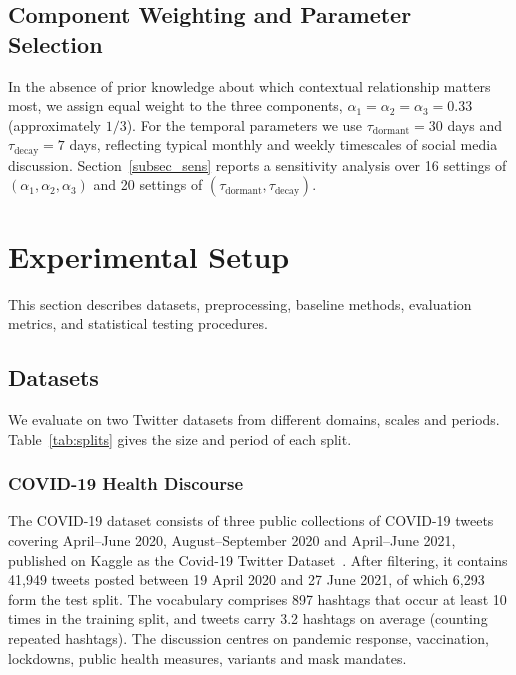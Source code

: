 \documentclass[pdflatex,sn-mathphys-num]{sn-jnl}%
\begin{document}
\subsection{Component Weighting and Parameter Selection}\label{subsec12}

In the absence of prior knowledge about which contextual relationship matters most, we assign equal weight to the three components, $\alpha_1 = \alpha_2 = \alpha_3 = 0.33$ (approximately $1/3$). For the temporal parameters we use $\tau_{\text{dormant}} = 30$ days and $\tau_{\text{decay}} = 7$ days, reflecting typical monthly and weekly timescales of social media discussion. Section~\ref{subsec_sens} reports a sensitivity analysis over 16 settings of $(\alpha_1, \alpha_2, \alpha_3)$ and 20 settings of $(\tau_{\text{dormant}}, \tau_{\text{decay}})$.


\section{Experimental Setup}\label{sec4}

This section describes datasets, preprocessing, baseline methods, evaluation metrics, and statistical testing procedures.

\subsection{Datasets}\label{subsec13}

We evaluate on two Twitter datasets from different domains, scales and periods. Table~\ref{tab:splits} gives the size and period of each split.

\subsubsection{COVID-19 Health Discourse}\label{subsubsec4}

The COVID-19 dataset consists of three public collections of COVID-19 tweets covering April--June 2020, August--September 2020 and April--June 2021, published on Kaggle as the Covid-19 Twitter Dataset~\cite{covid_kaggle}. After filtering, it contains 41,949 tweets posted between 19 April 2020 and 27 June 2021, of which 6,293 form the test split. The vocabulary comprises 897 hashtags that occur at least 10 times in the training split, and tweets carry 3.2 hashtags on average (counting repeated hashtags). The discussion centres on pandemic response, vaccination, lockdowns, public health measures, variants and mask mandates.
\end{document}
